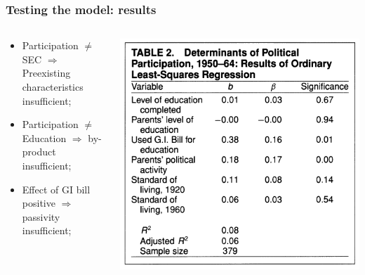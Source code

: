 \documentclass[aspectratio=169]{beamer}
\theoremstyle{principle}
\begin{document}
\begin{frame}
\frametitle{Testing the model: results}
\begin{columns}
\begin{column}{0.5\textwidth}
\begin{itemize}
\item Participation $\neq$ SEC $\Rightarrow$ Preexisting characteristics insufficient;
\bigskip
\item Participation $\neq$ Education $\Rightarrow$ by-product insufficient;
\bigskip
\item Effect of GI bill positive $\Rightarrow$ passivity insufficient;
\end{itemize}
\end{column}
\begin{column}{0.5\textwidth}
\begin{center}
\includegraphics[scale=0.4]{table_2.png}
\end{center}
\end{column}
\end{columns}
\end{frame}
\end{document}
